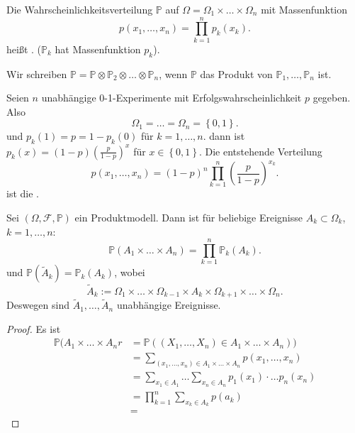 \begin{definition}[Produktmodell]\label{def:produktmodell}
    Die Wahrscheinlichkeitsverteilung $\mathbb{P}$ auf $\Omega = \Omega_1\times \ldots\times \Omega_n$ mit Massenfunktion
    \[
        p(x_1,\ldots,x_n) = \prod_{k=1}^n p_k(x_k)
    .\] 
    heißt . ($\mathbb{P}_k$ hat Massenfunktion $p_k$).
\end{definition}
\begin{notation}
    Wir schreiben $\mathbb{P} = \mathbb{P} \otimes \mathbb{P}_2 \otimes \ldots\otimes  \mathbb{P}_n$, wenn $\mathbb{P}$ das Produkt von $\mathbb{P}_1,\ldots,\mathbb{P}_n$ ist.
\end{notation}
\begin{example}
    Seien $n$ unabhängige  0-1-Experimente mit Erfolgswahrscheinlichkeit  $p$ gegeben. Also
     \[
    \Omega_1=\ldots=\Omega_n =\left \{0,1\right\} 
    .\] 
    und $p_k(1) = p = 1-p_k(0)$ für  $k=1,\ldots,n$. dann ist $p_k(x) = (1-p)\left( \frac{p}{1-p} \right) ^x$ für $x\in \left \{0,1\right\} $. Die entstehende Verteilung
    \[
        p(x_1,\ldots,x_n) = (1-p)^n \prod_{k=1}^n \left( \frac{p}{1-p} \right) ^{x_k}
    .\] 
    ist die .
\end{example}
\begin{theorem}
    Sei $(\Omega, \mathcal{F}, \mathbb{P})$ ein Produktmodell. Dann ist für beliebige Ereignisse $A_k \subset \Omega_k$, $k=1,\ldots,n$:
    \[
        \mathbb{P}(A_1\times \ldots\times A_n ) = \prod_{k=1}^n \mathbb{P}_k(A_k)
    .\] 
    und $\mathbb{P}(\tilde{A}_k) = \mathbb{P}_k(A_k)$, wobei
    \[
    \tilde{A}_k := \Omega_1\times \ldots\times \Omega_{k-1}\times A_k \times \Omega_{k+1} \times \ldots\times \Omega_n
    .\] 
    Deswegen sind $\tilde{A}_1,\ldots,\tilde{A}_n$ unabhängige Ereignisse.
\end{theorem}
\begin{proof}
    Es ist
    \begin{equation*}
        \begin{split}
            \mathbb{P}(A_1\times \ldots\times A_nr &= \mathbb{P}((X_1,\ldots,X_n)\in A_1\times \ldots\times A_n))  \\
                                                   &= \sum_{(x_1,\ldots,x_n) \in A_1\times \ldots\times A_n} p(x_1,\ldots,x_n) \\
                                                   &= \sum_{x_1\in A_1} \ldots\sum_{x_n\in A_n} p_1(x_1)\cdot \ldots p_n(x_n) \\
                                                   &=\prod_{k=1}^n \sum_{x_k\in A_k} p(a_k) \\
                                                   &= 
        \end{split}
    \end{equation*}
\end{proof}
